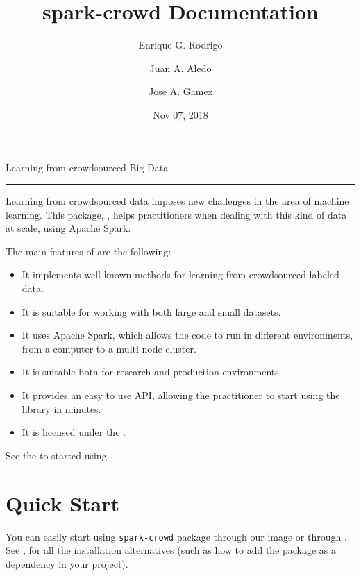 \documentclass[letterpaper,10pt,english]{sphinxmanual}
\title{spark-crowd Documentation}
\date{Nov 07, 2018}
\author{Enrique G. Rodrigo \and Juan A. Aledo \and Jose A. Gamez}
\begin{document}
\pagestyle{empty}
\maketitle
\pagestyle{plain}
\sphinxtableofcontents
\pagestyle{normal}
\label{\detokenize{index::doc}}


Learning from crowdsourced Big Data


\bigskip\hrule\bigskip
Learning from crowdsourced data imposes new challenges
in the area of machine learning. This package, , helps practitioners
when dealing with this kind of data at scale, using Apache Spark.

\noindent{}

The main features of  are the following:
\begin{itemize}
\item {} 
It implements well-known methods for learning from crowdsourced labeled data.

\item {} 
It is suitable for working with both large and small datasets.

\item {} 
It uses Apache Spark, which allows the code to run in different environments, from a computer to a multi-node cluster.

\item {} 
It is suitable both for research and production environments.

\item {} 
It provides an easy to use API, allowing the practitioner to start using the library in minutes.

\item {}
It is licensed under the .

\end{itemize}

See the {\hyperref[\detokenize{usage/quickstart:quickstart}]{}} to started using 






\chapter{Quick Start}
\label{\detokenize{usage/quickstart:quick-start}}\label{\detokenize{usage/quickstart:quickstart}}\label{\detokenize{usage/quickstart::doc}}
You can easily start using \texttt{spark-crowd} package through our  image or through .
See {\hyperref[\detokenize{usage/installation:installation}]{}}, for all the installation alternatives (such as how to add the package as a dependency in your project).
\end{document}

